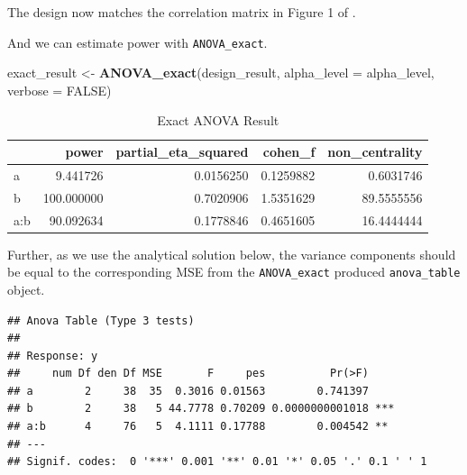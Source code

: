 \documentclass[
]{book}
\newenvironment{Shaded}{\begin{snugshade}}{\end{snugshade}}
\newcommand{\DataTypeTok}[1]{\textcolor[rgb]{0.13,0.29,0.53}{#1}}
\newcommand{\KeywordTok}[1]{\textcolor[rgb]{0.13,0.29,0.53}{\textbf{#1}}}
\newcommand{\NormalTok}[1]{#1}
\newcommand{\OperatorTok}[1]{\textcolor[rgb]{0.81,0.36,0.00}{\textbf{#1}}}
\newcommand{\OtherTok}[1]{\textcolor[rgb]{0.56,0.35,0.01}{#1}}
\newcommand{\StringTok}[1]{\textcolor[rgb]{0.31,0.60,0.02}{#1}}
\begin{document}
The design now matches the correlation matrix in Figure 1 of \citet{potvin2000statistical}.

And we can estimate power with \texttt{ANOVA\_exact}.

\begin{Shaded}
\begin{Highlighting}[]
\NormalTok{exact_result <-}\StringTok{ }\KeywordTok{ANOVA_exact}\NormalTok{(design_result,}
                            \DataTypeTok{alpha_level =}\NormalTok{ alpha_level,}
                            \DataTypeTok{verbose =} \OtherTok{FALSE}\NormalTok{)}
\end{Highlighting}
\end{Shaded}

\begin{table}[!h]

\caption{\label{tab:unnamed-chunk-120}Exact ANOVA Result}
\centering
\begin{tabular}[t]{l|r|r|r|r}
\hline
  & power & partial\_eta\_squared & cohen\_f & non\_centrality\\
\hline
a & 9.441726 & 0.0156250 & 0.1259882 & 0.6031746\\
\hline
b & 100.000000 & 0.7020906 & 1.5351629 & 89.5555556\\
\hline
a:b & 90.092634 & 0.1778846 & 0.4651605 & 16.4444444\\
\hline
\end{tabular}
\end{table}

Further, as we use the analytical solution below, the variance components should be equal to the corresponding MSE from the \texttt{ANOVA\_exact} produced \texttt{anova\_table} object.

\begin{Shaded}
\end{Shaded}

\begin{verbatim}
## Anova Table (Type 3 tests)
## 
## Response: y
##     num Df den Df MSE       F     pes          Pr(>F)    
## a        2     38  35  0.3016 0.01563        0.741397    
## b        2     38   5 44.7778 0.70209 0.0000000001018 ***
## a:b      4     76   5  4.1111 0.17788        0.004542 ** 
## ---
## Signif. codes:  0 '***' 0.001 '**' 0.01 '*' 0.05 '.' 0.1 ' ' 1
\end{verbatim}
\end{document}
